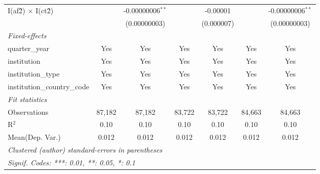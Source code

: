 \begin{tabular}{lcccccc}
   I(af\^2) $\times$ I(ct\^2)         &                & -0.00000006$^{**}$ &                & -0.00001       &                & -0.00000006$^{**}$\\   
                                      &                & (0.00000003)       &                & (0.000007)     &                & (0.00000003)\\   
   \midrule
   \emph{Fixed-effects}\\
   quarter\_year                      & Yes            & Yes                & Yes            & Yes            & Yes            & Yes\\  
   institution                        & Yes            & Yes                & Yes            & Yes            & Yes            & Yes\\  
   institution\_type                  & Yes            & Yes                & Yes            & Yes            & Yes            & Yes\\  
   institution\_country\_code         & Yes            & Yes                & Yes            & Yes            & Yes            & Yes\\  
   \midrule
   \emph{Fit statistics}\\
   Observations                       & 87,182         & 87,182             & 83,722         & 83,722         & 84,663         & 84,663\\  
   R$^2$                              & 0.10           & 0.10               & 0.10           & 0.10           & 0.10           & 0.10\\  
Mean(Dep. Var.) & 0.012 & 0.012 & 0.012 & 0.012 & 0.012 & 0.012 \\
   \midrule \midrule
   \multicolumn{7}{l}{\emph{Clustered (author) standard-errors in parentheses}}\\
   \multicolumn{7}{l}{\emph{Signif. Codes: ***: 0.01, **: 0.05, *: 0.1}}\\
\end{tabular}
\par\endgroup
